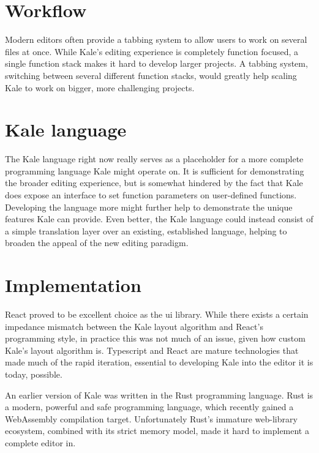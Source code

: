 \section{Workflow}
Modern editors often provide a tabbing system to allow
users to work on several files at once. While Kale's editing experience
is completely function focused, a single function stack makes it hard
to develop larger projects. A tabbing system, switching between several
different function stacks, would greatly help scaling Kale to work on bigger,
more challenging projects.

\section{Kale language}
The Kale language right now really serves as a placeholder for a more complete
programming language Kale might operate on.
It is sufficient for demonstrating the broader editing experience, but is somewhat
hindered by the fact that Kale does expose an interface to set function parameters
on user-defined functions. Developing the language more might further help to
demonstrate the unique features Kale can provide. Even better, the Kale language
could instead consist of a simple translation layer over an existing, established
language, helping to broaden the appeal of the new editing paradigm. 


\section{Implementation}
React proved to be excellent choice as the \ac{ui} library. While there exists a
certain impedance mismatch between the Kale layout algorithm and React's programming
style, in practice this was not much of an issue, given how custom Kale's layout
algorithm is. Typescript and React are mature technologies that made much of
the rapid iteration, essential to developing Kale into the editor it is today, possible.

An earlier version of Kale was written in the Rust programming language. Rust is a
modern, powerful and safe programming language, which recently gained a WebAssembly
compilation target. Unfortunately Rust's immature web-library ecosystem,
combined with its strict memory model, made it hard to implement a complete editor in.
